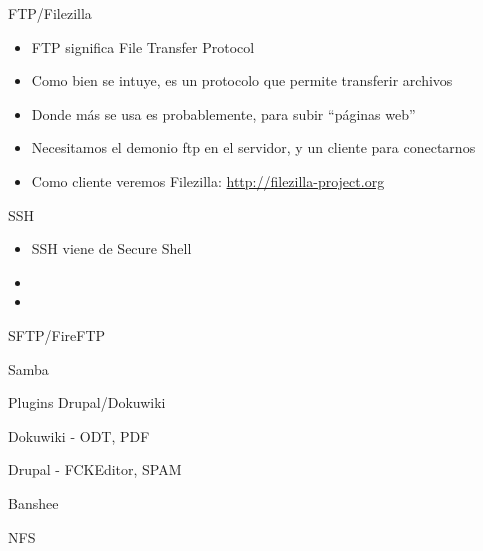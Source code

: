 \documentclass[spanish]{beamer}
\begin{document}
\begin{frame}{FTP/Filezilla}
\begin{itemize}
\item FTP significa File Transfer Protocol
\item Como bien se intuye, es un protocolo que permite transferir archivos
\item Donde más se usa es probablemente, para subir ``páginas web''
\item Necesitamos el demonio ftp en el servidor, y un cliente para conectarnos
\item Como cliente veremos Filezilla: \url{http://filezilla-project.org}
\end{itemize}
\end{frame}
\begin{frame}{SSH}
\begin{itemize}
\item SSH viene de Secure Shell
\item 
\item 
\end{itemize}
\end{frame}
\begin{frame}{SFTP/FireFTP}
\end{frame}
\begin{frame}{Samba}
\end{frame}
\begin{frame}{Plugins Drupal/Dokuwiki}
\end{frame}
\begin{frame}{Dokuwiki - ODT, PDF}
\end{frame}
\begin{frame}{Drupal - FCKEditor, SPAM}
\end{frame}
\begin{frame}{Banshee}
\end{frame}
\begin{frame}{NFS}
\end{frame}
\end{document}
